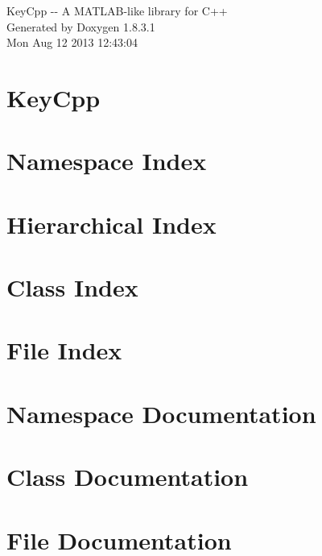 \documentclass{book}
\begin{document}
\hypersetup{pageanchor=false,citecolor=blue}
\begin{titlepage}
\vspace*{7cm}
\begin{center}
{\Large Key\-Cpp -\/-\/ A M\-A\-T\-L\-A\-B-\/like library for C++ }\\
\vspace*{1cm}
{\large Generated by Doxygen 1.8.3.1}\\
\vspace*{0.5cm}
{\small Mon Aug 12 2013 12:43:04}\\
\end{center}
\end{titlepage}
\clearemptydoublepage
{}
\tableofcontents
\clearemptydoublepage
{}
\hypersetup{pageanchor=true,citecolor=blue}
\chapter{Key\-Cpp}
\label{index}\hypertarget{index}{}
\chapter{Namespace Index}

\chapter{Hierarchical Index}

\chapter{Class Index}

\chapter{File Index}

\chapter{Namespace Documentation}

\chapter{Class Documentation}

















\chapter{File Documentation}

\printindex
\end{document}
